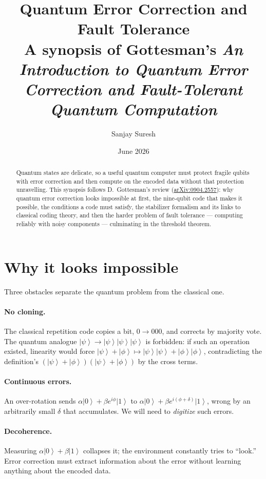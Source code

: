 \documentclass[11pt]{article}
\title{\textbf{Quantum Error Correction and Fault Tolerance}\\[0.3em]
  \large A synopsis of Gottesman's \emph{An Introduction to Quantum Error Correction
  and Fault-Tolerant Quantum Computation}}
\author{Sanjay Suresh}
\date{June 2026}
\newcommand{\ket}[1]{\left|#1\right\rangle}
\theoremstyle{plain}
\begin{document}
\maketitle

\begin{abstract}
\noindent Quantum states are delicate, so a useful quantum computer must protect fragile qubits
with error correction and then compute on the encoded data without that protection unravelling.
This synopsis follows D.\ Gottesman's review
(\href{https://arxiv.org/abs/0904.2557}{arXiv:0904.2557}): why quantum error correction looks
impossible at first, the nine-qubit code that makes it possible, the conditions a code must satisfy,
the stabilizer formalism and its links to classical coding theory, and then the harder problem of
fault tolerance --- computing reliably with noisy components --- culminating in the threshold theorem.
\end{abstract}

\section{Why it looks impossible}
Three obstacles separate the quantum problem from the classical one.

\paragraph{No cloning.} The classical repetition code copies a bit, $0\to000$, and corrects by
majority vote. The quantum analogue $\ket{\psi}\to\ket{\psi}\ket{\psi}\ket{\psi}$ is forbidden: if
such an operation existed, linearity would force
$\ket{\psi}+\ket{\phi}\mapsto\ket{\psi}\ket{\psi}+\ket{\phi}\ket{\phi}$, contradicting the
definition's $(\ket{\psi}+\ket{\phi})(\ket{\psi}+\ket{\phi})$ by the cross terms.

\paragraph{Continuous errors.} An over-rotation sends $\alpha\ket0+\beta e^{i\phi}\ket1$ to
$\alpha\ket0+\beta e^{i(\phi+\delta)}\ket1$, wrong by an arbitrarily small $\delta$ that accumulates.
We will need to \emph{digitize} such errors.

\paragraph{Decoherence.} Measuring $\alpha\ket0+\beta\ket1$ collapses it; the environment constantly
tries to ``look.'' Error correction must extract information about the error without learning anything
about the encoded data.
\end{document}
